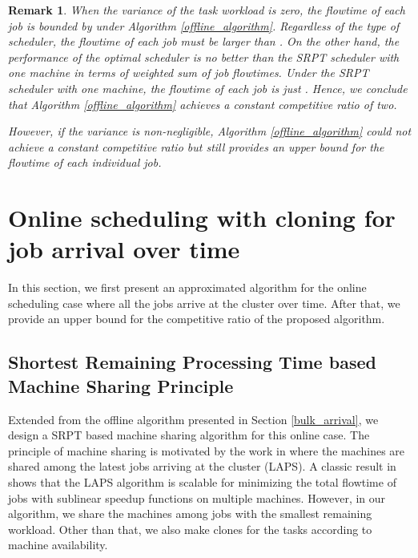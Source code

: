 \documentclass[10pt,conference,compsocconf,letterpaper]{IEEEtran}
\newtheorem{remark}{Remark}
\begin{document}
\begin{remark}
When the variance of the task workload is zero, the flowtime of each job is bounded by  under Algorithm \ref{offline_algorithm}. Regardless of the type of 
scheduler, the flowtime of each job must be larger than . On the other hand, the performance of the optimal scheduler is no better than the SRPT scheduler with one machine in terms of weighted sum of job flowtimes. Under the SRPT scheduler with one machine, the flowtime of each job is just . Hence, we conclude that Algorithm \ref{offline_algorithm} achieves a constant competitive ratio of two.

However, if the variance is non-negligible, Algorithm \ref{offline_algorithm} could not achieve a constant competitive ratio but still provides an upper bound for the flowtime of each individual job.
\end{remark}




\section{Online scheduling with cloning for job arrival over time}
\label{online-scheduling}
\vspace{-.3em}

In this section, we first present an approximated algorithm for the online scheduling case where all the jobs arrive at the cluster over time. After that, we
provide an upper bound for the competitive ratio of the proposed algorithm.

\subsection{Shortest Remaining Processing Time based Machine Sharing Principle}
\label{algorithm_design}
Extended from the offline algorithm presented in Section \ref{bulk_arrival},  we design a SRPT based machine sharing algorithm for this online case. The principle of machine sharing  is motivated by the work in \cite{scalably-scheduling,Reduce_variance,energy_efficient} where the machines are shared among the latest jobs arriving at the cluster (LAPS).
A classic result in \cite{scalably-scheduling} shows that
the LAPS algorithm  is scalable for minimizing the total flowtime of jobs with sublinear speedup functions on multiple machines. However, in our algorithm, we share the machines among jobs with the smallest remaining workload.  Other than that, we also make clones for the tasks according to machine availability.
\end{document}
